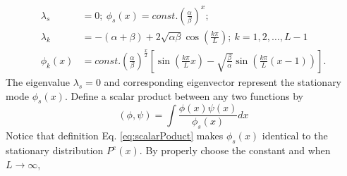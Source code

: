 \documentclass[12pt,a4paper]{article}
\begin{document}
\begin{equation}
    \label{eq:single-particle-eigenmodes}
    \begin{aligned}
        \lambda_s & = 0; 
        ~\phi_s(x) = const. \left(\frac{\alpha}{\beta}\right)^{x}; \\
        \lambda_k & = -(\alpha+\beta) +
        2\sqrt{\alpha\beta}\cos(\frac{k\pi}{L}); 
        ~k=1,2,\dots, L-1 \\
        \phi_k(x) & = const. \left(\frac{\alpha}{\beta}\right)^{\frac{x}{2}}
            \left[\sin\left(\frac{k\pi}{L}x\right) -
                \sqrt{\frac{\beta}{\alpha}}\sin\left(\frac{k\pi}{L}(x-1)\right)\right].
    \end{aligned}
\end{equation}
The eigenvalue $\lambda_s = 0$ and corresponding eigenvector represent the
stationary mode $\phi_s(x)$. Define a scalar product between any two functions
by \begin{equation} \label{eq:scalarPoduct} (\phi, \psi) =
    \int\frac{\phi(x)\psi(x)}{\phi_{s}(x)}dx 
\end{equation}
Notice that definition Eq. \eqref{eq:scalarPoduct} makes $\phi_s(x)$ identical
to the stationary distribution $P^e(x)$.
By properly choose the constant and when $L\rightarrow\infty$,
\end{document}
